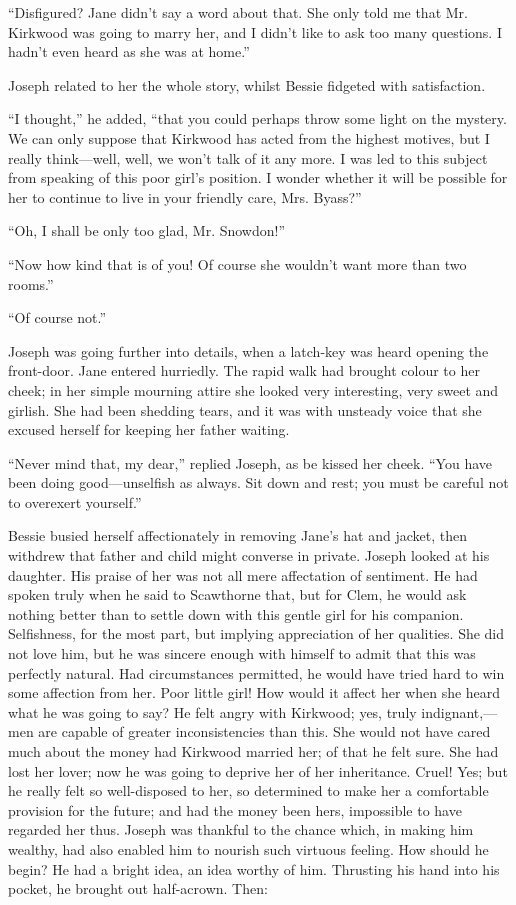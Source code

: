 ``Disfigured? Jane didn't say a word about that. She only told me that
Mr. Kirkwood was going to marry her, and I didn't like to ask too many
questions. I hadn't even heard as she was at home.''

Joseph related to her the whole story, whilst Bessie fidgeted with
satisfaction.

``I thought,'' he added, ``that you could {}perhaps throw some light on
the mystery. We can only suppose that Kirkwood has acted from the
highest motives, but I really think---well, well, we won't talk of it
any more. I was led to this subject from speaking of this poor girl's
position. I wonder whether it will be possible for her to continue to
live in your friendly care, Mrs. Byass?''

``Oh, I shall be only too glad, Mr. Snowdon!''

``Now how kind that is of you! Of course she wouldn't want more than two
rooms.''

``Of course not.''

Joseph was going further into details, when a latch-key was heard
opening the front-door. Jane entered hurriedly. The rapid walk had
brought colour to her cheek; in her simple mourning attire she looked
very interesting, very sweet and girlish. She had been shedding tears,
and it was with unsteady voice that she excused herself for keeping her
father waiting.

``Never mind that, my dear,'' replied Joseph, as be kissed her cheek.
``You have been doing good---unselfish as always. Sit down and rest; you
must be careful not to overexert yourself.''

{}Bessie busied herself affectionately in removing Jane's hat and
jacket, then withdrew that father and child might converse in private.
Joseph looked at his daughter. His praise of her was not all mere
affectation of sentiment. He had spoken truly when he said to Scawthorne
that, but for Clem, he would ask nothing better than to settle down with
this gentle girl for his companion. Selfishness, for the most part, but
implying appreciation of her qualities. She did not love him, but he was
sincere enough with himself to admit that this was perfectly natural.
Had circumstances permitted, he would have tried hard to win some
affection from her. Poor little girl! How would it affect her when she
heard what he was going to say? He felt angry with Kirkwood; yes, truly
indignant,---men are capable of greater inconsistencies than this. She
would not have cared much about the money had Kirkwood married her; of
that he felt sure. She had lost her lover; now he was going to deprive
her of her inheritance. Cruel! Yes; but he really felt so well-disposed
to her, so determined to make her a comfortable provision for the
future; and had the {}money been hers, impossible to have regarded her
thus. Joseph was thankful to the chance which, in making him wealthy,
had also enabled him to nourish such virtuous feeling. How should he
begin? He had a bright idea, an idea worthy of him. Thrusting his hand
into his pocket, he brought out half-acrown. Then:

